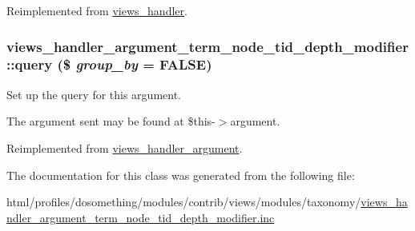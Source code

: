 Reimplemented from \hyperlink{classviews__handler_a4eeb5551d6c97b1ea074049991989fce}{views\_\-handler}.\hypertarget{classviews__handler__argument__term__node__tid__depth__modifier_af38aca7016ef74b4fe04dc33fb332748}{
\subsubsection[{query}]{\setlength{\rightskip}{0pt plus 5cm}views\_\-handler\_\-argument\_\-term\_\-node\_\-tid\_\-depth\_\-modifier::query (\$ {\em group\_\-by} = {\ttfamily FALSE})}}
\label{classviews__handler__argument__term__node__tid__depth__modifier_af38aca7016ef74b4fe04dc33fb332748}
Set up the query for this argument.

The argument sent may be found at \$this-\/$>$argument. 

Reimplemented from \hyperlink{classviews__handler__argument_af9ddabf5d386782c8ffc5785b7ae4263}{views\_\-handler\_\-argument}.

The documentation for this class was generated from the following file:\begin{DoxyCompactItemize}
\item 
html/profiles/dosomething/modules/contrib/views/modules/taxonomy/\hyperlink{views__handler__argument__term__node__tid__depth__modifier_8inc}{views\_\-handler\_\-argument\_\-term\_\-node\_\-tid\_\-depth\_\-modifier.inc}\end{DoxyCompactItemize}
